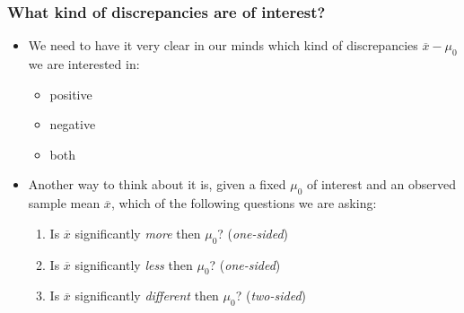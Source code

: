 \documentclass[a4paper]{article}
\begin{document}
\subsubsection{What kind of discrepancies are of interest?}
\begin{itemize}
	\item We need to have it very clear in our minds which kind of discrepancies \( \overline{x} - \mu_0 \) we are interested in:
	\begin{itemize}
		\item positive
		\item negative
		\item both
	\end{itemize}
	\item Another way to think about it is, given a fixed \( \mu_0 \) of interest and an observed sample mean \( \overline{x} \), which of the following questions we are asking:
	\begin{enumerate}
		\item Is \( \overline{x} \) significantly \textit{more} then \( \mu_0 \)? (\textit{one-sided})
		\item Is \( \overline{x} \) significantly \textit{less} then \( \mu_0 \)? (\textit{one-sided})
		\item Is \( \overline{x} \) significantly \textit{different} then \( \mu_0 \)? (\textit{two-sided})
	\end{enumerate}
\end{itemize}
\end{document}
